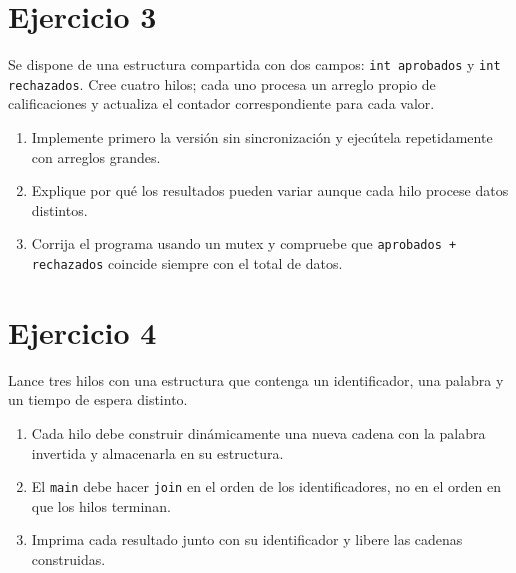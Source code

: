 \documentclass[12pt,a4paper]{article}
\begin{document}
\section*{Ejercicio 3}
Se dispone de una estructura compartida con dos campos: \texttt{int aprobados} y \texttt{int rechazados}. Cree cuatro hilos; cada uno procesa un arreglo propio de calificaciones y actualiza el contador correspondiente para cada valor.
\begin{enumerate}
    \item Implemente primero la versión sin sincronización y ejecútela repetidamente con arreglos grandes.
    \item Explique por qué los resultados pueden variar aunque cada hilo procese datos distintos.
    \item Corrija el programa usando un mutex y compruebe que \texttt{aprobados + rechazados} coincide siempre con el total de datos.
\end{enumerate}

\section*{Ejercicio 4}
Lance tres hilos con una estructura que contenga un identificador, una palabra y un tiempo de espera distinto.
\begin{enumerate}
    \item Cada hilo debe construir dinámicamente una nueva cadena con la palabra invertida y almacenarla en su estructura.
    \item El \texttt{main} debe hacer \texttt{join} en el orden de los identificadores, no en el orden en que los hilos terminan.
    \item Imprima cada resultado junto con su identificador y libere las cadenas construidas.
\end{enumerate}
\end{document}
